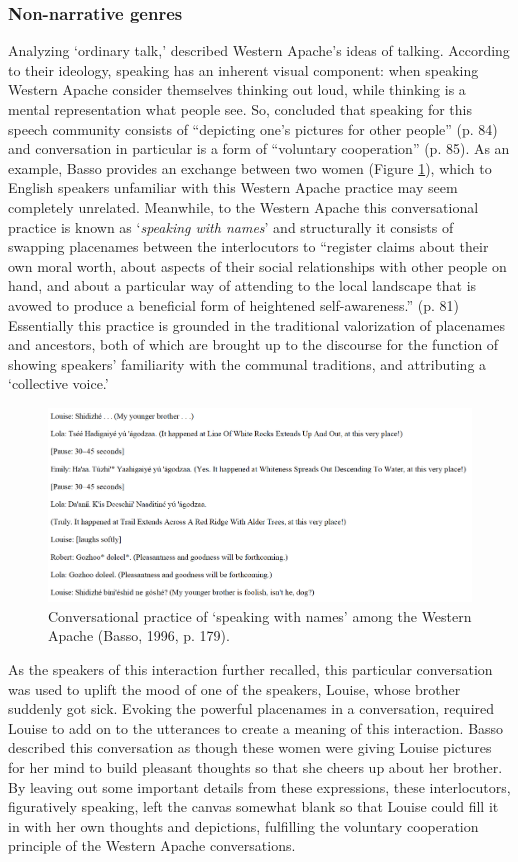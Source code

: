 \documentclass[12pt, draft]{article}
\begin{document}
\subsubsection{Non-narrative genres}
Analyzing `ordinary talk,' \textcite{basso1996} described Western Apache's ideas of talking. According to their ideology, speaking has an inherent visual component: when speaking Western Apache consider themselves thinking out loud, while thinking is a mental representation what people see. So, \textcite{basso1996} concluded that speaking for this speech community consists of ``depicting one's pictures for other people'' (p. 84) and conversation in particular is a form of ``voluntary cooperation'' (p. 85). As an example, Basso provides an exchange between two women (Figure \ref{speaking_names}), which to English speakers unfamiliar with this Western Apache practice may seem completely unrelated. Meanwhile, to the Western Apache this conversational practice is known as `\textit{speaking with names}' and structurally it consists of swapping placenames between the interlocutors to ``register claims about their own moral worth, about aspects of their social relationships with other people on hand, and about a particular way of attending to the local landscape that is avowed to produce a beneficial form of heightened self-awareness.'' (p. 81) Essentially this practice is grounded in the traditional valorization of placenames and ancestors, both of which are brought up to the discourse for the function of showing speakers' familiarity with the communal traditions, and attributing a `collective voice.' 
\begin{figure}
\caption{Conversational practice of `speaking with names' among the Western Apache (Basso, 1996, p. 179).}
\label{speaking_names}
\includegraphics[width=5in]{speaking_names.png}
\end{figure}

As the speakers of this interaction further recalled, this particular conversation was used to uplift the mood of one of the speakers, Louise, whose brother suddenly got sick. Evoking the powerful placenames in a conversation, required Louise to add on to the utterances to create a meaning of this interaction. Basso described this conversation as though these women were giving Louise pictures for her mind to build pleasant thoughts so that she cheers up about her brother. By leaving out some important details from these expressions, these interlocutors, figuratively speaking, left the canvas somewhat blank so that Louise could fill it in with her own thoughts and depictions, fulfilling the voluntary cooperation principle of the Western Apache conversations. 
\end{document}

